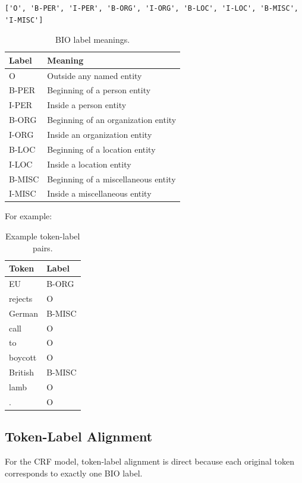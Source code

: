 \documentclass[11pt,a4paper]{article}
\begin{document}
\begin{lstlisting}
['O', 'B-PER', 'I-PER', 'B-ORG', 'I-ORG', 'B-LOC', 'I-LOC', 'B-MISC', 'I-MISC']
\end{lstlisting}

\begin{table}[H]
\centering
\caption{BIO label meanings.}
\begin{tabular}{ll}
\toprule
Label & Meaning \\
\midrule
O & Outside any named entity \\
B-PER & Beginning of a person entity \\
I-PER & Inside a person entity \\
B-ORG & Beginning of an organization entity \\
I-ORG & Inside an organization entity \\
B-LOC & Beginning of a location entity \\
I-LOC & Inside a location entity \\
B-MISC & Beginning of a miscellaneous entity \\
I-MISC & Inside a miscellaneous entity \\
\bottomrule
\end{tabular}
\end{table}

For example:

\begin{table}[H]
\centering
\caption{Example token-label pairs.}
\begin{tabular}{ll}
\toprule
Token & Label \\
\midrule
EU & B-ORG \\
rejects & O \\
German & B-MISC \\
call & O \\
to & O \\
boycott & O \\
British & B-MISC \\
lamb & O \\
. & O \\
\bottomrule
\end{tabular}
\end{table}

\subsection{Token-Label Alignment}

For the CRF model, token-label alignment is direct because each original token corresponds to exactly one BIO label.
\end{document}

